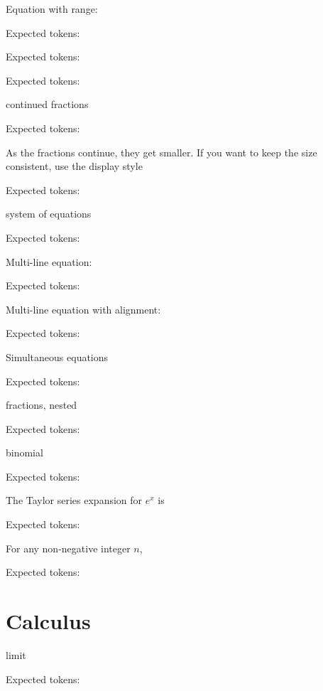 \documentclass{article}
\begin{document}
\hrulefill


Equation with range:
    
Expected tokens: 

\hrulefill



Expected tokens: 

\hrulefill



Expected tokens: 

\hrulefill

continued fractions
    
Expected tokens: 

\hrulefill

As the fractions continue, they get smaller. If you want to keep the size consistent, use the display style
    
Expected tokens: 

\hrulefill

system of equations

Expected tokens: 

\hrulefill

Multi-line equation:
    
Expected tokens: 

\hrulefill

Multi-line equation with alignment:

Expected tokens: 

\hrulefill

Simultaneous equations

Expected tokens: 

\hrulefill

fractions, nested

Expected tokens: 

\hrulefill

binomial

Expected tokens: 

\hrulefill

The Taylor series expansion for $e^x$ is 

Expected tokens: 

\hrulefill


For any non-negative integer $n$,

Expected tokens: 

\hrulefill


\section{Calculus}
limit

Expected tokens: 
\end{document}
